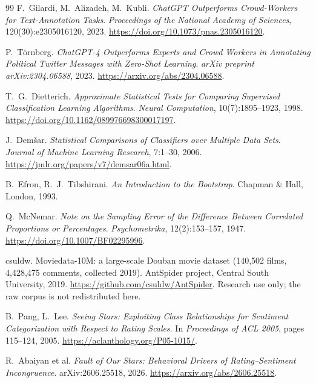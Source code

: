 \documentclass[11pt,a4paper]{article}
\begin{document}
\begin{thebibliography}{99}
F.~Gilardi, M.~Alizadeh, M.~Kubli.
\newblock \emph{ChatGPT Outperforms Crowd-Workers for Text-Annotation Tasks}.
\newblock \emph{Proceedings of the National Academy of Sciences}, 120(30):e2305016120, 2023.
\newblock \url{https://doi.org/10.1073/pnas.2305016120}.

P.~T\"ornberg.
\newblock \emph{ChatGPT-4 Outperforms Experts and Crowd Workers in Annotating
Political Twitter Messages with Zero-Shot Learning}.
\newblock \emph{arXiv preprint arXiv:2304.06588}, 2023.
\newblock \url{https://arxiv.org/abs/2304.06588}.

T.~G.~Dietterich.
\newblock \emph{Approximate Statistical Tests for Comparing Supervised Classification Learning Algorithms}.
\newblock \emph{Neural Computation}, 10(7):1895--1923, 1998.
\newblock \url{https://doi.org/10.1162/089976698300017197}.

J.~Dem\v{s}ar.
\newblock \emph{Statistical Comparisons of Classifiers over Multiple Data Sets}.
\newblock \emph{Journal of Machine Learning Research}, 7:1--30, 2006.
\newblock \url{https://jmlr.org/papers/v7/demsar06a.html}.

B.~Efron, R.~J.~Tibshirani.
\newblock \emph{An Introduction to the Bootstrap}.
\newblock Chapman \& Hall, London, 1993.

Q.~McNemar.
\newblock \emph{Note on the Sampling Error of the Difference Between Correlated Proportions or Percentages}.
\newblock \emph{Psychometrika}, 12(2):153--157, 1947.
\newblock \url{https://doi.org/10.1007/BF02295996}.

csuldw. Moviedata-10M: a large-scale Douban movie dataset (140{,}502
films, 4{,}428{,}475 comments, collected 2019).
\newblock AntSpider project, Central South University, 2019.
\newblock \url{https://github.com/csuldw/AntSpider}. Research use only;
the raw corpus is not redistributed here.

B.~Pang, L.~Lee.
\newblock \emph{Seeing Stars: Exploiting Class Relationships for Sentiment
Categorization with Respect to Rating Scales}.
\newblock In \emph{Proceedings of ACL 2005}, pages 115--124, 2005.
\newblock \url{https://aclanthology.org/P05-1015/}.

R.~Abaiyan et al.
\newblock \emph{Fault of Our Stars: Behavioral Drivers of Rating--Sentiment
Incongruence}.
\newblock arXiv:2606.25518, 2026.
\newblock \url{https://arxiv.org/abs/2606.25518}.


\end{thebibliography}
\end{document}
